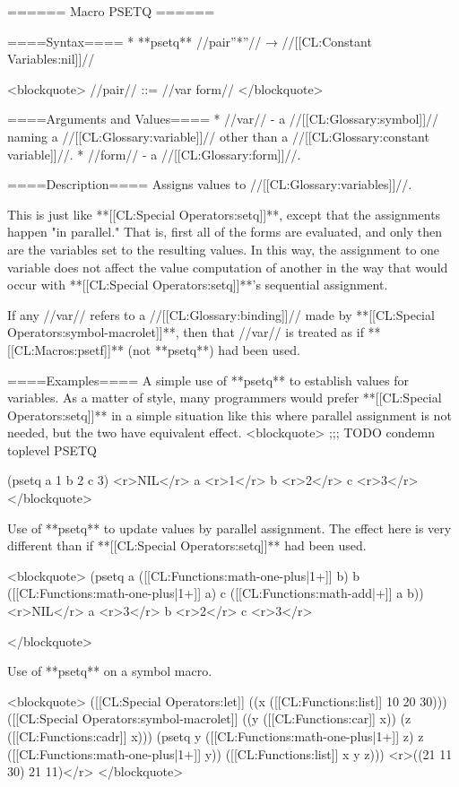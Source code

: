 ====== Macro PSETQ ======

====Syntax====
  * **psetq** //{pair''*''}// → //[[CL:Constant Variables:nil]]//
  
<blockquote>
//pair// ::= //var form//
</blockquote>

====Arguments and Values====
  * //var// - a //[[CL:Glossary:symbol]]// naming a //[[CL:Glossary:variable]]// other than a //[[CL:Glossary:constant variable]]//.
  * //form// - a //[[CL:Glossary:form]]//.

====Description====
Assigns values to //[[CL:Glossary:variables]]//.

This is just like **[[CL:Special Operators:setq]]**, except that the assignments happen "in parallel." That is, first all of the forms are evaluated, and only then are the variables set to the resulting values. In this way, the assignment to one variable does not affect the value computation of another in the way that would occur with **[[CL:Special Operators:setq]]**'s sequential assignment.

If any //var// refers to a //[[CL:Glossary:binding]]// made by **[[CL:Special Operators:symbol-macrolet]]**, then that //var// is treated as if **[[CL:Macros:psetf]]** (not **psetq**) had been used.

====Examples====
A simple use of **psetq** to establish values for variables. As a matter of style, many programmers would prefer **[[CL:Special Operators:setq]]** in a simple situation like this where parallel assignment is not needed, but the two have equivalent effect. 
<blockquote>
;;; TODO condemn toplevel PSETQ

(psetq a 1 b 2 c 3) <r>NIL</r>
a <r>1</r>
b <r>2</r>
c <r>3</r>
</blockquote>

Use of **psetq** to update values by parallel assignment. The effect here is very different than if **[[CL:Special Operators:setq]]** had been used.

<blockquote>
(psetq a ([[CL:Functions:math-one-plus|1+]] b) b ([[CL:Functions:math-one-plus|1+]] a) c ([[CL:Functions:math-add|+]] a b)) <r>NIL</r>
a <r>3</r>
b <r>2</r>
c <r>3</r>

</blockquote>

Use of **psetq** on a symbol macro.

<blockquote>
([[CL:Special Operators:let]] ((x ([[CL:Functions:list]] 10 20 30)))
  ([[CL:Special Operators:symbol-macrolet]] ((y ([[CL:Functions:car]] x)) (z ([[CL:Functions:cadr]] x)))
    (psetq y ([[CL:Functions:math-one-plus|1+]] z) z ([[CL:Functions:math-one-plus|1+]] y))
    ([[CL:Functions:list]] x y z))) 
<r>((21 11 30) 21 11)</r>
</blockquote>

